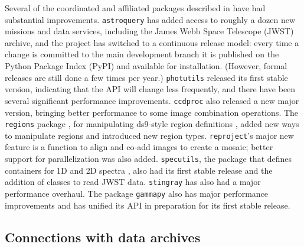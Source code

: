 \documentclass[modern]{aastex631}
\newcommand{\secauthor}[1]{{\color{blue}Author:~\textit{#1}}}
\begin{document}
Several of the coordinated and affiliated packages described in
\cite{astropy:2018} have had substantial improvements. \texttt{astroquery}
\citep{astroquery} has added access to roughly a dozen new missions and data
services, including the James Webb Space Telescope (JWST) archive, and the
project has switched to a continuous release model: every time a change is
committed to the main development branch it is published on the Python Package
Index (PyPI) and available for installation. (However, formal releases are still
done a few times per year.) \texttt{photutils} \citep{photutils} released its
first stable version, indicating that the API will change less frequently, and
there have been several significant performance improvements. \texttt{ccdproc}
\citep{ccdproc} also released a new major version, bringing better performance to
some image combination operations. The \texttt{regions} package
\citep{pyregions}, for manipulating ds9-style region definitions \citep{ds9},
added new ways to manipulate regions and introduced new region types.
\texttt{reproject}'s \citep{reproject} major new feature is a function to align
and co-add images to create a mosaic; better support for parallelization was
also added. \texttt{specutils}, the package that defines containers for 1D and
2D spectra \citep{specutils}, also had its first stable release and the addition
of classes to read JWST data. \texttt{stingray} has also had a major performance
overhaul. The package \texttt{gammapy} \citep{gammapy} also has major performance
improvements and has unified its API in preparation for its first stable
release.

\subsection{Connections with data archives}
\label{sec:astroquery}

\end{document}

